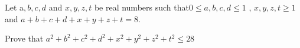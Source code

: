 Let a$,b,c,d$ and $x,y,z,t$ be real numbers such that$0\le a,b,c,d \le 1$ ,  $x,y,z,t \ge 1$ and $a+b+c+d +x+y+z+t=8$.

Prove that $a^2+b^2+c^2+d^2+x^2+y^2+z^2+t^2\le 28$